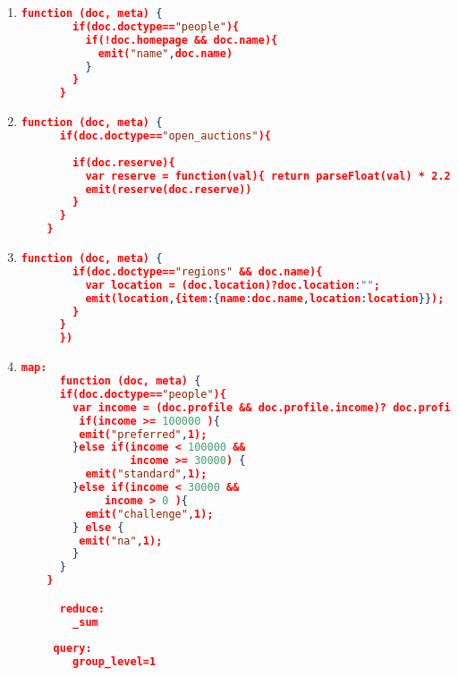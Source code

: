 \begin{enumerate}[label=Q\arabic*.]
    
    \item %
	\begin{lstlisting}[language=JSON, basicstyle=\scriptsize]
	  function (doc, meta) {
	    if(doc.doctype=="people"){
	      if(!doc.homepage && doc.name){
	        emit("name",doc.name)
	      } 
	    }
	  }
	\end{lstlisting}	

    \item %
	\begin{lstlisting}[language=JSON, basicstyle=\scriptsize]
	  function (doc, meta) {
      if(doc.doctype=="open_auctions"){
        
        if(doc.reserve){
          var reserve = function(val){ return parseFloat(val) * 2.20371 }
          emit(reserve(doc.reserve))
        } 
      }
    }
	\end{lstlisting}	

    \item %
	\begin{lstlisting}[language=JSON, basicstyle=\scriptsize]
	  function (doc, meta) {
	    if(doc.doctype=="regions" && doc.name){
	      var location = (doc.location)?doc.location:"";
	      emit(location,{item:{name:doc.name,location:location}});
	    }
	  }
	  })
	\end{lstlisting}	
	
    \item %
	\begin{lstlisting}[language=JSON, basicstyle=\scriptsize]
	  map:
	  function (doc, meta) {
      if(doc.doctype=="people"){ 
        var income = (doc.profile && doc.profile.income)? doc.profile.income : 0;
         if(income >= 100000 ){
      	 emit("preferred",1);
        }else if(income < 100000 && 
                 income >= 30000) {
          emit("standard",1);
        }else if(income < 30000 &&
             income > 0 ){
          emit("challenge",1);
        } else {
         emit("na",1);
        }    
      }
    }

	  reduce:
	    _sum
	 
	 query:
	    group_level=1
	\end{lstlisting}

\end{enumerate}
